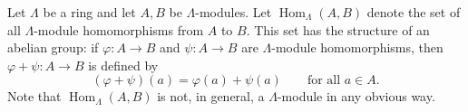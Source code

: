 Let $\Lambda$ be a ring and let $A, B$ be $\Lambda$-modules. Let $\operatorname{Hom}_{\Lambda}(A, B)$ denote the set of all $\Lambda$-module homomorphisms from $A$ to $B$. This set has the structure of an abelian group: if $\varphi \colon A \to B$ and $\psi \colon A \to B$ are $\Lambda$-module homomorphisms, then $\varphi + \psi \colon A \to B$ is defined by
$$
(\varphi + \psi)(a) = \varphi(a) + \psi(a) \qquad \text{for all } a \in A.
$$
Note that $\operatorname{Hom}_{\Lambda}(A, B)$ is not, in general, a $\Lambda$-module in any obvious way.
